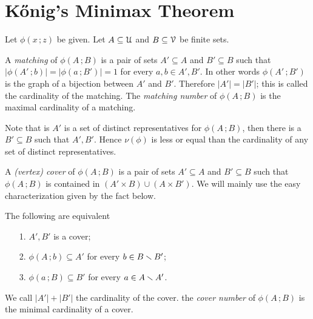 \documentclass[scombinatorics.tex]{subfiles}
\begin{document}
\section{K\H{o}nig's Minimax Theorem}\label{Konig}


Let $\phi(x\,;z)$ be given. 
Let $A\subseteq\EuScript U$ and $B\subseteq\EuScript V$ be finite sets. 

A \emph{matching\/} of $\phi(A\,;B)$ is a pair of sets $A'\subseteq A$  and $B'\subseteq B$ such that $|\phi(A'\,;b)|=|\phi(a\,;B')|= 1$ for every $a,b\in A',B'$.
In other words $\phi(A'\,;B')$ is the graph of a bijection between $A'$ and $B'$.
Therefore $|A'|=|B'|$; this is called the cardinality of the matching.
The \emph{matching number} of $\phi(A\,;B)$ is the maximal cardinality of a matching.

Note that is $A'$ is a set of distinct representatives for $\phi(A\,;B)$, then there is a $B'\subseteq B$ such that $A',B'$.
Hence $\nu(\phi)$ is less or equal than the cardinality of any set of distinct representatives.


A \emph{(vertex) cover\/} of $\phi(A\,;B)$ is a pair of sets $A'\subseteq A$ and $B'\subseteq B$ such that $\phi(A\,;B)$ is contained in $(A'\times B)\cup (A\times B')$. We will mainly use the easy characterization given by the fact below.

\begin{fact}
   The following are equivalent
   \begin{itemize}
      \item[1.] $A',B'$ is a cover;
      \item[2.] $\phi(A\,;b)\subseteq A'$ for every $b\in B\smallsetminus B'$;
      \item[3.] $\phi(a\,;B)\subseteq B'$ for every $a\in A\smallsetminus A'$.\QED
   \end{itemize}
\end{fact}

We call $|A'|+|B'|$ the cardinality of the cover.
the \emph{cover number\/} of $\phi(A\,;B)$ is the minimal cardinality of a cover.
\end{document}
